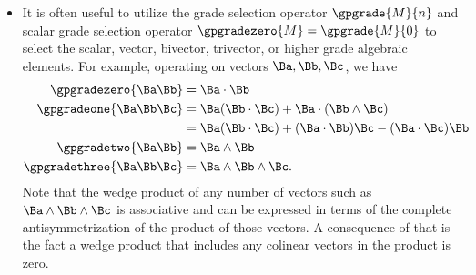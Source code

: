 \begin{itemize}
\item It is often useful to utilize the grade selection operator
\( \gpgrade{M}{n} \) and scalar grade selection operator \( \gpgradezero{M} = \gpgrade{M}{0} \)
to select the scalar, vector, bivector, trivector, or higher grade algebraic elements.  For example, operating on vectors \( \Ba, \Bb, \Bc \), we have
%
\begin{equation}\label{eqn:gaTutorial:580}
\begin{aligned}
\gpgradezero{ \Ba \Bb }
&= \Ba \cdot \Bb \\
\gpgradeone{ \Ba \Bb \Bc }
&=
\Ba (\Bb \cdot \Bc)
+
\Ba \cdot (\Bb \wedge \Bc) \\
&=
\Ba (\Bb \cdot \Bc)
+
(\Ba \cdot \Bb) \Bc
-
(\Ba \cdot \Bc) \Bb \\
\gpgradetwo{\Ba \Bb} &=
\Ba \wedge \Bb \\
\gpgradethree{\Ba \Bb \Bc} &=
\Ba \wedge \Bb \wedge \Bc.
\end{aligned}
\end{equation}
%
Note that the wedge product of any number of vectors such as \( \Ba \wedge \Bb \wedge \Bc \) is associative and can be expressed in terms of the complete antisymmetrization of the product of those vectors.  A consequence of that is the fact a wedge product that includes any colinear vectors in the product is zero.
\end{itemize}
%
